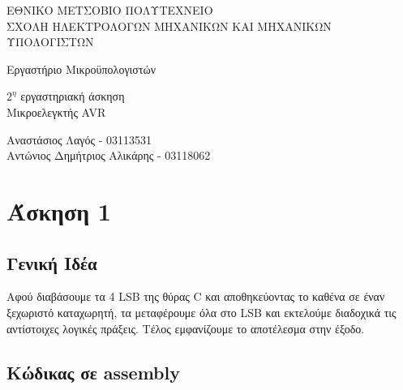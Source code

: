 \documentclass[11pt]{article}
\begin{document}
\begin{titlepage}
	\begin{center}
		{ 
			ΕΘΝΙΚΟ ΜΕΤΣΟΒΙΟ ΠΟΛΥΤΕΧΝΕΙΟ\\
			ΣΧΟΛΗ ΗΛΕΚΤΡΟΛΟΓΩΝ ΜΗΧΑΝΙΚΩΝ ΚΑΙ ΜΗΧΑΝΙΚΩΝ ΥΠΟΛΟΓΙΣΤΩΝ
		}
		
		\vfill

		{\Large
			Εργαστήριο Μικροϋπολογιστών
		}
		
		{\large
			$2^η$ εργαστηριακή άσκηση \\ Μικροελεγκτής AVR 
		}

		\vfill

		{
			Αναστάσιος Λαγός - 03113531\\
			Αντώνιος Δημήτριος Αλικάρης - 03118062
		}
	\end{center}
\end{titlepage}


\section*{Άσκηση 1}

\subsection*{Γενική Ιδέα}

Αφού διαβάσουμε τα 4 LSB της θύρας C και αποθηκεύοντας το καθένα σε έναν ξεχωριστό καταχωρητή, τα μεταφέρουμε όλα στο LSB και εκτελούμε διαδοχικά τις αντίστοιχες λογικές πράξεις. Τέλος εμφανίζουμε το αποτέλεσμα στην έξοδο.

\subsection*{Κώδικας σε assembly}
\end{document}
